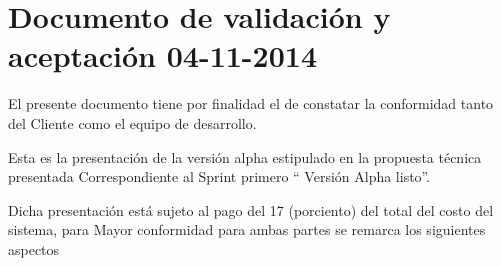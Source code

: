 \chapter{Documento de validaci\'{o}n y aceptaci\'{o}n 04-11-2014}

El presente documento tiene por finalidad el de constatar la conformidad tanto
del Cliente como el equipo de desarrollo.

Esta es la presentaci\'{o}n de la versi\'{o}n alpha estipulado en la propuesta
t\'{e}cnica presentada Correspondiente al Sprint primero \textquotedblleft 
Versi\'{o}n Alpha listo\textquotedblright .

Dicha presentaci\'{o}n est\'{a} sujeto al pago del 17 (porciento) del total del
costo del sistema, para Mayor conformidad para ambas partes se remarca los
siguientes aspectos


